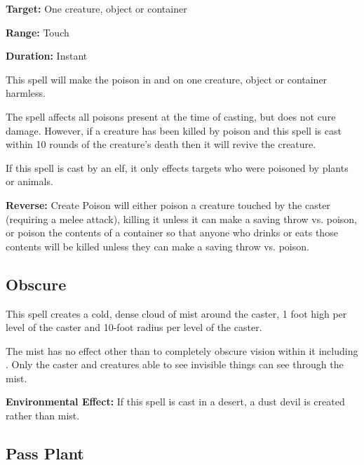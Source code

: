 \begin{multicols*}{2}
{\textbf{Target:} One creature, object or container

\textbf{Range:} Touch

\textbf{Duration:} Instant}

This spell will make the poison in and on one creature, object or container harmless.

The spell affects all poisons present at the time of casting, but does not cure damage. However, if a creature has been killed by poison and this spell is cast within 10 rounds of the creature’s death then it will revive the creature.

If this spell is cast by an elf, it only effects targets who were poisoned by plants or animals.

\textbf{Reverse:} \hypertarget{spell:Create Poison}{Create Poison} will either poison a creature touched by the caster (requiring a melee attack), killing it unless it can make a saving throw vs. poison, or poison the contents of a container so that anyone who drinks or eats those contents will be killed unless they can make a saving throw vs. poison.

\subsection{Obscure}\label{spell:Obscure}

This spell creates a cold, dense cloud of mist around the caster, 1 foot high per level of the caster and 10-foot radius per level of the caster.

The mist has no effect other than to completely obscure vision within it including . Only the caster and creatures able to see invisible things can see through the mist.

\textbf{Environmental Effect:} If this spell is cast in a desert, a dust devil is created rather than mist.

\subsection{Pass Plant}\label{spell:Pass Plant}
\end{multicols*}
